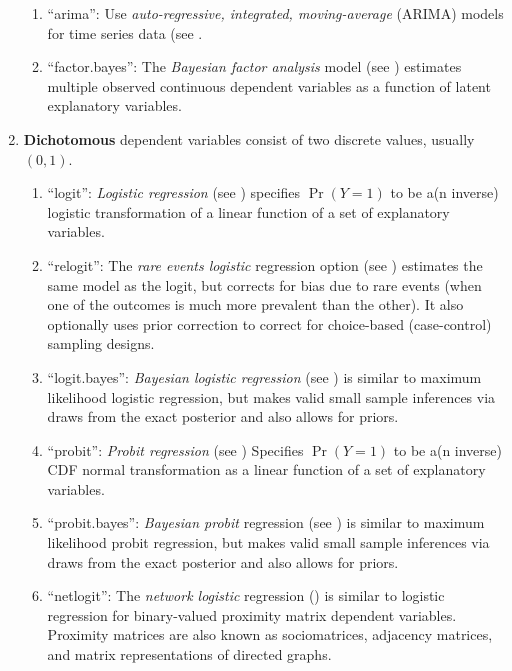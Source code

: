 \documentclass[letterpaper,10pt,english]{sphinxmanual}
\begin{document}
\begin{enumerate}
\begin{enumerate}
\item {} 
“arima”: Use \emph{auto-regressive, integrated, moving-average} (ARIMA)
models for time series data (see .

\item {} 
“factor.bayes”: The \emph{Bayesian factor analysis} model (see )
estimates multiple observed continuous dependent variables as a
function of latent explanatory variables.

\end{enumerate}

\item {} 
\textbf{Dichotomous} dependent variables consist of two discrete values,
usually \((0,1)\).
\begin{enumerate}
\item {} 
“logit”: \emph{Logistic regression} (see ) specifies \(\Pr(Y=1)\)
to be a(n inverse) logistic transformation of a linear function of
a set of explanatory variables.

\item {} 
“relogit”: The \emph{rare events logistic} regression option (see )
estimates the same model as the logit, but corrects for bias due
to rare events (when one of the outcomes is much more prevalent
than the other). It also optionally uses prior correction to
correct for choice-based (case-control) sampling designs.

\item {} 
“logit.bayes”: \emph{Bayesian logistic regression} (see ) is similar to
maximum likelihood logistic regression, but makes valid small
sample inferences via draws from the exact posterior and also
allows for priors.

\item {} 
“probit”: \emph{Probit regression} (see ) Specifies \(\Pr(Y=1)\) to
be a(n inverse) CDF normal transformation as a linear function of
a set of explanatory variables.

\item {} 
“probit.bayes”: \emph{Bayesian probit} regression (see ) is similar to
maximum likelihood probit regression, but makes valid small sample
inferences via draws from the exact posterior and also allows for
priors.

\item {} 
“netlogit”: The \emph{network logistic} regression () is similar to
logistic regression for binary-valued proximity matrix dependent
variables. Proximity matrices are also known as sociomatrices,
adjacency matrices, and matrix representations of directed graphs.


\end{enumerate}
\end{enumerate}
\end{document}
